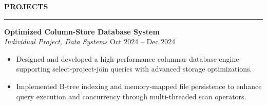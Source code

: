 \documentclass[11pt,a4paper]{article}
\newcommand{\sectionheading}[1]{\vspace{0.2cm}\textbf{\Large #1}\vspace{0.1cm}\hrule\vspace{0.3cm}}
\newcommand{\subheading}[1]{\textbf{#1}}
\newcommand{\daterange}[1]{\hfill{#1}}
\begin{document}
\sectionheading{PROJECTS}
\subheading{Optimized Column-Store Database System} \\
\textit{Individual Project, Data Systems} \hfill \daterange{Oct 2024 -- Dec 2024}
\begin{itemize}[leftmargin=*,nosep]
    \item Designed and developed a high-performance columnar database engine supporting select-project-join queries with advanced storage optimizations.
    \item Implemented B-tree indexing and memory-mapped file persistence to enhance query execution and concurrency through multi-threaded scan operators.
\end{itemize}

\end{document}
